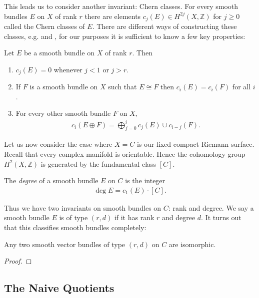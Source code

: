 \documentclass[12pt]{ociamthesis}  %
\begin{document}
This leads us to consider another invariant: Chern classes. For
every smooth bundles $E$ on $X$ of rank $r$ there are elements
$c_j(E)\in H^{2j}(X,\mathbb{Z})$ for $j\geq 0$ called the Chern
classes of $E$. There are different ways of constructing these classes,
e.g. \cite{fine2013} and \cite{griffiths1994}, for our purposes
it is sufficient to know a few key properties:

\begin{lemma}\missingcitation
  Let $E$ be a smooth bundle on $X$ of rank $r$. Then
  \begin{enumerate}
    \item $c_j(E) = 0$ whenever $j<1$ or $j>r$.
    \item If $F$ is a smooth bundle on $X$ such that $E\cong F$
          then $c_i(E) = c_i(F)$ for all $i$.
    \item For every other smooth bundle $F$ on $X$,
          \begin{align*}
            c_i(E\oplus F) = \bigoplus_{j=0}^{i} c_j(E)\cup c_{i-j}(F).
          \end{align*}
  \end{enumerate}
\end{lemma}

Let us now consider the case where $X=C$ is our fixed compact Riemann surface.
Recall that every complex manifold is orientable. Hence the cohomology
group $H^2(X,\mathbb{Z})$ is generated by the fundamental class $[C]$.

\begin{definition}
  The \emph{degree} of a smooth bundle $E$ on $C$ is the integer
  \begin{align*}
    \deg E = c_1(E)\cdot[C].
  \end{align*}
\end{definition}

Thus we have two invariants on smooth bundles on $C$: rank and degree.
We say a smooth bundle $E$ is of type $(r,d)$ if it has rank $r$
and degree $d$. It turns out that this classifies smooth bundles
completely:

\begin{theorem}
  Any two smooth vector bundles of type $(r,d)$ on $C$
  are isomorphic.
  \begin{proof}
    \missingproof
  \end{proof}
\end{theorem}

\missingsection

\subsection{The Naive Quotients}
\end{document}
